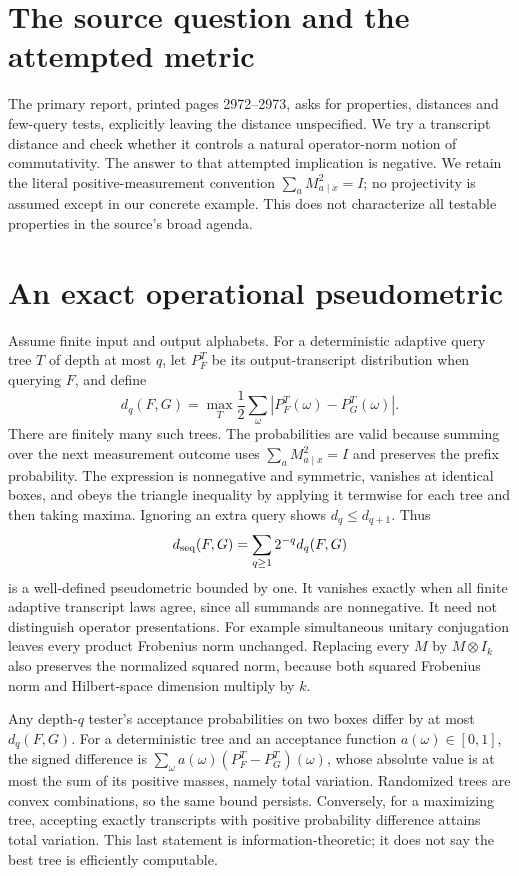 \documentclass[11pt]{article}
\begin{document}
\section{The source question and the attempted metric}
The primary report, printed pages 2972--2973, asks for properties,
distances and few-query tests, explicitly leaving the distance
unspecified. We try a transcript distance and check whether it
controls a natural operator-norm notion of commutativity. The
answer to that attempted implication is negative. We retain the
literal positive-measurement convention
$\sum_aM_{a\mid x}^2=I$; no projectivity is assumed except in
our concrete example. This does not characterize all testable
properties in the source's broad agenda.

\section{An exact operational pseudometric}
Assume finite input and output alphabets. For a deterministic
adaptive query tree $T$ of depth at most $q$, let $P_F^T$ be its
output-transcript distribution when querying $F$, and define
\[
 d_q(F,G)=\max_T\frac12\sum_\omega
 |P_F^T(\omega)-P_G^T(\omega)|.
\]
There are finitely many such trees. The probabilities are valid
because summing over the next measurement outcome uses
$\sum_aM_{a\mid x}^2=I$ and preserves the prefix probability.
The expression is nonnegative and symmetric, vanishes at identical
boxes, and obeys the triangle inequality by applying it termwise
for each tree and then taking maxima. Ignoring an extra query
shows $d_q\le d_{q+1}$. Thus
\[
 d_{\rm seq}(F,G)=\sum_{q\ge1}2^{-q}d_q(F,G)
\]
is a well-defined pseudometric bounded by one. It vanishes exactly
when all finite adaptive transcript laws agree, since all summands
are nonnegative. It need not distinguish operator presentations.
For example simultaneous unitary conjugation leaves every product
Frobenius norm unchanged. Replacing every $M$ by $M\otimes I_k$
also preserves the normalized squared norm, because both squared
Frobenius norm and Hilbert-space dimension multiply by $k$.

Any depth-$q$ tester's acceptance probabilities on two boxes differ
by at most $d_q(F,G)$. For a deterministic tree and an acceptance
function $a(\omega)\in[0,1]$, the signed difference is
$\sum_\omega a(\omega)(P_F^T-P_G^T)(\omega)$, whose absolute
value is at most the sum of its positive masses, namely total
variation. Randomized trees are convex combinations, so the same
bound persists. Conversely, for a maximizing tree, accepting
exactly transcripts with positive probability difference attains
total variation. This last statement is information-theoretic;
it does not say the best tree is efficiently computable.
\end{document}
